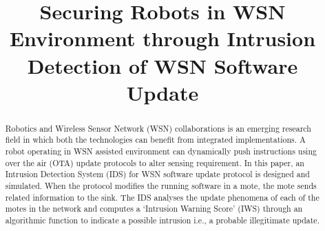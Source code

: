 \documentclass[conference,final]{IEEEtran}
\begin{document}
\title{Securing Robots in WSN Environment through Intrusion Detection of WSN Software Update}

\author{
}



\maketitle

\begin{abstract}
Robotics and  Wireless Sensor Network (WSN) collaborations is an emerging research field in which both the technologies can benefit from integrated implementations.
A robot operating in WSN assisted environment can dynamically push instructions using over the air (OTA) update protocols to alter sensing requirement.
In this paper, an Intrusion Detection System (IDS) for WSN  software update protocol is designed and simulated. 
When the protocol modifies the running software in a mote, the mote sends related  information to the sink. 
The IDS analyses the update phenomena of each of the motes in the network and computes a `Intrusion Warning Score' (IWS) through an algorithmic function to indicate a possible intrusion i.e., a probable illegitimate update.
\end{abstract}



%
\IEEEpeerreviewmaketitle %
\end{document}
